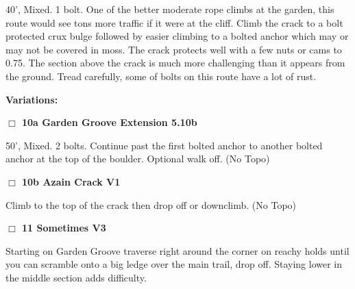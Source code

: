 \begin{multicols}{2}
\begin{adjustwidth}{1.3em}{}
40', Mixed. 1 bolt. One of the better moderate rope climbs at the garden, this route would see tons more traffic if it were at the cliff. Climb the crack to a bolt protected crux bulge followed by easier climbing to a bolted anchor which may or may not be covered in moss. The crack protects well with a few nuts or cams to 0.75. The section above the crack is much more challenging than it appears from the ground. Tread carefully, some of bolts on this route have a lot of rust.
\end{adjustwidth}


\begin{adjustwidth}{0.5cm}{}				
\needspace{4em}
\textbf{Variations:} \newline

\needspace{2em}
\label{vr:Garden Groove Extension}
\colorbox{RoyalBlue!20}{
\parbox{0.95\linewidth}{
\hspace{-1ex}\textbf{$\Box$
10a Garden Groove Extension 5.10b  
}}}
\begin{adjustwidth}{1.3em}{}			

50', Mixed. 2 bolts. Continue past the first bolted anchor to another bolted anchor at the top of the boulder. Optional walk off.
  (No Topo)
\end{adjustwidth}




\needspace{2em}
\label{vr:Azain Crack}
\colorbox{green!20}{
\parbox{0.95\linewidth}{
\hspace{-1ex}\textbf{$\Box$
10b Azain Crack V1  
}}}
\begin{adjustwidth}{1.3em}{}			

Climb to the top of the crack then drop off or downclimb.
  (No Topo)
\end{adjustwidth}



\end{adjustwidth}


\needspace{2em}
\label{rt:Sometimes}
\colorbox{green!20}{
\parbox{0.95\linewidth}{
\hspace{-1ex}\textbf{$\Box$
11 Sometimes V3  
}}}
\begin{adjustwidth}{1.3em}{}			

Starting on Garden Groove traverse right around the corner on reachy holds until you can scramble onto a big ledge over the main trail, drop off. Staying lower in the middle section adds difficulty.
\end{adjustwidth}





\end{multicols}
